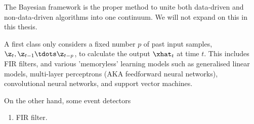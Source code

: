 The Bayesian framework is the proper method to unite both data-driven and
non-data-driven algorithms into one continuum. We will not expand on this in
this thesis.


A first class only considers a fixed number $p$ of past input samples, $\z_t,
\z_{t-1} \tdots \z_{t-p}$, to calculate the output $\xhat_t$ at time $t$.
This includes FIR filters, and various 'memoryless' learning models such as
generalised linear models, multi-layer perceptrons (AKA feedforward neural
networks), convolutional neural networks, and support vector machines.

On the other hand, some event detectors 


\begin{enumerate}
\item FIR filter. 
\end{enumerate}

